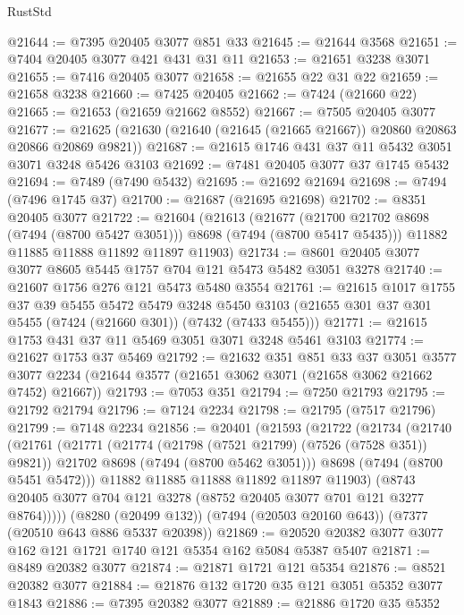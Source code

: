 \begin{lexlean}{RustStd}
\begin{coremodule}
@21644 := @7395 @20405 @3077 @851 @33
@21645 := @21644 @3568
@21651 := @7404 @20405 @3077 @421 @431 @31 @11
@21653 := @21651 @3238 @3071
@21655 := @7416 @20405 @3077
@21658 := @21655 @22 @31 @22
@21659 := @21658 @3238
@21660 := @7425 @20405
@21662 := @7424 (@21660 @22)
@21665 := @21653 (@21659 @21662 @8552)
@21667 := @7505 @20405 @3077
@21677 := @21625 (@21630 (@21640 (@21645 (@21665 @21667)) @20860 @20863 @20866 @20869 @9821))
@21687 := @21615 @1746 @431 @37 @11 @5432 @3051 @3071 @3248 @5426 @3103
@21692 := @7481 @20405 @3077 @37 @1745 @5432
@21694 := @7489 (@7490 @5432)
@21695 := @21692 @21694
@21698 := @7494 (@7496 @1745 @37)
@21700 := @21687 (@21695 @21698)
@21702 := @8351 @20405 @3077
@21722 := @21604
    (@21613
      (@21677 (@21700 @21702 @8698 (@7494 (@8700 @5427 @3051))) @8698 (@7494 (@8700 @5417 @5435)))
      @11882
      @11885
      @11888
      @11892
      @11897
      @11903)
@21734 := @8601 @20405 @3077 @3077 @8605 @5445 @1757 @704 @121 @5473 @5482 @3051 @3278
@21740 := @21607 @1756 @276 @121 @5473 @5480 @3554
@21761 := @21615
    @1017
    @1755
    @37
    @39
    @5455
    @5472
    @5479
    @3248
    @5450
    @3103
    (@21655 @301 @37 @301 @5455 (@7424 (@21660 @301)) (@7432 (@7433 @5455)))
@21771 := @21615 @1753 @431 @37 @11 @5469 @3051 @3071 @3248 @5461 @3103
@21774 := @21627 @1753 @37 @5469
@21792 := @21632
    @351
    @851
    @33
    @37
    @3051
    @3577
    @3077
    @2234
    (@21644 @3577 (@21651 @3062 @3071 (@21658 @3062 @21662 @7452) @21667))
@21793 := @7053 @351
@21794 := @7250 @21793
@21795 := @21792 @21794
@21796 := @7124 @2234
@21798 := @21795 (@7517 @21796)
@21799 := @7148 @2234
@21856 := @20401
    (@21593
      (@21722
        (@21734
          (@21740
            (@21761
              (@21771
                (@21774 (@21798 (@7521 @21799) (@7526 (@7528 @351)) @9821))
                @21702
                @8698
                (@7494 (@8700 @5462 @3051)))
              @8698
              (@7494 (@8700 @5451 @5472)))
            @11882
            @11885
            @11888
            @11892
            @11897
            @11903)
          (@8743 @20405 @3077 @704 @121 @3278 (@8752 @20405 @3077 @701 @121 @3277 @8764)))))
    (@8280 (@20499 @132))
    (@7494 (@20503 @20160 @643))
    (@7377 (@20510 @643 @886 @5337 @20398))
@21869 := @20520 @20382 @3077 @3077 @162 @121 @1721 @1740 @121 @5354 @162 @5084 @5387 @5407
@21871 := @8489 @20382 @3077
@21874 := @21871 @1721 @121 @5354
@21876 := @8521 @20382 @3077
@21884 := @21876 @132 @1720 @35 @121 @3051 @5352 @3077 @1843
@21886 := @7395 @20382 @3077
@21889 := @21886 @1720 @35 @5352

\end{coremodule}
\end{lexlean}
